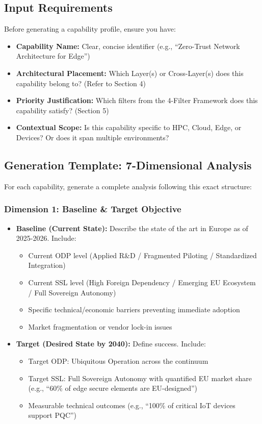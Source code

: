 \documentclass[12pt,a4paper]{article}
\begin{document}
\subsection*{Input Requirements}
Before generating a capability profile, ensure you have:
\begin{itemize}
    \item \textbf{Capability Name:} Clear, concise identifier (e.g., ``Zero-Trust Network Architecture for Edge'')
    \item \textbf{Architectural Placement:} Which Layer(s) or Cross-Layer(s) does this capability belong to? (Refer to Section 4)
    \item \textbf{Priority Justification:} Which filters from the 4-Filter Framework does this capability satisfy? (Section 5)
    \item \textbf{Contextual Scope:} Is this capability specific to HPC, Cloud, Edge, or Devices? Or does it span multiple environments?
\end{itemize}

\subsection*{Generation Template: 7-Dimensional Analysis}
For each capability, generate a complete analysis following this exact structure:

\subsubsection*{Dimension 1: Baseline \& Target Objective}
\begin{itemize}
    \item \textbf{Baseline (Current State):} Describe the state of the art in Europe as of 2025-2026. Include:
    \begin{itemize}
        \item Current ODP level (Applied R\&D / Fragmented Piloting / Standardized Integration)
        \item Current SSL level (High Foreign Dependency / Emerging EU Ecosystem / Full Sovereign Autonomy)
        \item Specific technical/economic barriers preventing immediate adoption
        \item Market fragmentation or vendor lock-in issues
    \end{itemize}
    \item \textbf{Target (Desired State by 2040):} Define success. Include:
    \begin{itemize}
        \item Target ODP: Ubiquitous Operation across the continuum
        \item Target SSL: Full Sovereign Autonomy with quantified EU market share (e.g., ``60\% of edge secure elements are EU-designed'')
        \item Measurable technical outcomes (e.g., ``100\% of critical IoT devices support PQC'')
    \end{itemize}
\end{itemize}
\end{document}
